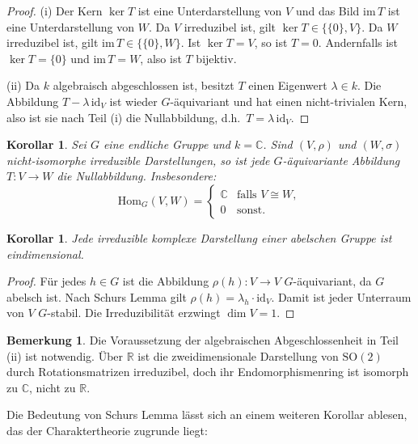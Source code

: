\documentclass[12pt,a4paper]{amsart}
\newtheorem{korollar}[theorem]{Korollar}
\theoremstyle{definition}
\newtheorem{bemerkung}[theorem]{Bemerkung}
\begin{document}
\begin{proof}
(i) Der Kern $\ker T$ ist eine Unterdarstellung von $V$ und das Bild
$\mathrm{im}\, T$ ist eine Unterdarstellung von $W$.  Da $V$ irreduzibel ist,
gilt $\ker T \in \{\{0\},V\}$.  Da $W$ irreduzibel ist, gilt
$\mathrm{im}\, T \in \{\{0\},W\}$.  Ist $\ker T = V$, so ist $T = 0$.
Andernfalls ist $\ker T = \{0\}$ und $\mathrm{im}\, T = W$, also ist $T$
bijektiv.

(ii) Da $k$ algebraisch abgeschlossen ist, besitzt $T$ einen Eigenwert
$\lambda \in k$.  Die Abbildung $T - \lambda\,\mathrm{id}_V$ ist wieder
$G$-äquivariant und hat einen nicht-trivialen Kern, also ist sie nach Teil (i)
die Nullabbildung, d.h.\ $T = \lambda\,\mathrm{id}_V$.
\end{proof}

\begin{korollar}
\label{kor:schur}
Sei $G$ eine endliche Gruppe und $k = \mathbb{C}$.  Sind $(V,\rho)$ und
$(W,\sigma)$ nicht-isomorphe irreduzible Darstellungen, so ist jede
$G$-äquivariante Abbildung $T \colon V \to W$ die Nullabbildung.  Insbesondere:
\[
    \mathrm{Hom}_G(V,W) = \begin{cases} \mathbb{C} & \text{falls } V \cong W, \\ 0 & \text{sonst.} \end{cases}
\]
\end{korollar}

\begin{korollar}
Jede irreduzible komplexe Darstellung einer abelschen Gruppe ist eindimensional.
\end{korollar}

\begin{proof}
Für jedes $h \in G$ ist die Abbildung $\rho(h) \colon V \to V$ $G$-äquivariant,
da $G$ abelsch ist.  Nach Schurs Lemma gilt $\rho(h) = \lambda_h \cdot
\mathrm{id}_V$.  Damit ist jeder Unterraum von $V$ $G$-stabil.  Die
Irreduzibilität erzwingt $\dim V = 1$.
\end{proof}

\begin{bemerkung}
Die Voraussetzung der algebraischen Abgeschlossenheit in Teil (ii) ist notwendig.
Über $\mathbb{R}$ ist die zweidimensionale Darstellung von $\mathrm{SO}(2)$ durch
Rotationsmatrizen irreduzibel, doch ihr Endomorphismenring ist isomorph zu
$\mathbb{C}$, nicht zu $\mathbb{R}$.
\end{bemerkung}

Die Bedeutung von Schurs Lemma lässt sich an einem weiteren Korollar ablesen,
das der Charaktertheorie zugrunde liegt:
\end{document}
